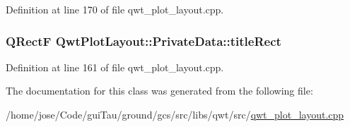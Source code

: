 Definition at line 170 of file qwt\-\_\-plot\-\_\-layout.\-cpp.

\hypertarget{class_qwt_plot_layout_1_1_private_data_ab74a819b13e480044627527c27473006}{
\subsubsection[{title\-Rect}]{\setlength{\rightskip}{0pt plus 5cm}Q\-Rect\-F Qwt\-Plot\-Layout\-::\-Private\-Data\-::title\-Rect}}\label{class_qwt_plot_layout_1_1_private_data_ab74a819b13e480044627527c27473006}


Definition at line 161 of file qwt\-\_\-plot\-\_\-layout.\-cpp.



The documentation for this class was generated from the following file\-:\begin{DoxyCompactItemize}
\item 
/home/jose/\-Code/gui\-Tau/ground/gcs/src/libs/qwt/src/\hyperlink{qwt__plot__layout_8cpp}{qwt\-\_\-plot\-\_\-layout.\-cpp}\end{DoxyCompactItemize}
